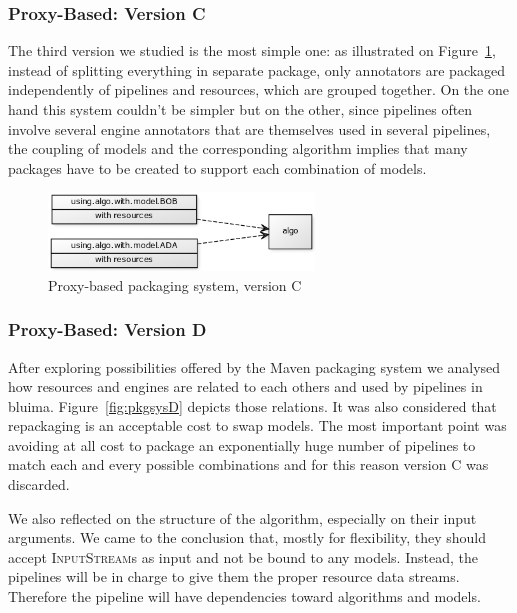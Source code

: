 \documentclass{article}
\newcommand{\ID}[1]{{\textsc{#1}}}
\begin{document}
\begin{appendices}
\subsubsection{Proxy-Based: Version C}

The third version we studied is the most simple one: as illustrated on Figure~\ref{fig:pkgsysC},
instead of splitting everything in separate package, only annotators are packaged independently of
pipelines and resources, which are grouped together. On the one hand this system couldn't be simpler
but on the other, since pipelines often involve several engine annotators that are themselves used
in several pipelines, the coupling of models and the corresponding algorithm implies that many
packages have to be created to support each combination of models.


\begin{figure}
    \centering
    \includegraphics[width=200pt]{res/packaging_version_C.png}
    \caption{Proxy-based packaging system, version C}
    \label{fig:pkgsysC}
\end{figure}

\subsubsection{Proxy-Based: Version D}

After exploring possibilities offered by the Maven packaging system we analysed how resources and
engines are related to each others and used by pipelines in bluima. Figure~\ref{fig:pkgsysD} depicts
those relations. It was also considered that repackaging is an acceptable cost to swap models. The
most important point was avoiding at all cost to package an exponentially huge number of pipelines
to match each and every possible combinations and for this reason version C was discarded.

We also reflected on the structure of the algorithm, especially on their input arguments. We came to
the conclusion that, mostly for flexibility, they should accept \ID{InputStream}s as input and not
be bound to any models. Instead, the pipelines will be in charge to give them the proper resource
data streams. Therefore the pipeline will have dependencies toward algorithms and models.


\end{appendices}
\end{document}
